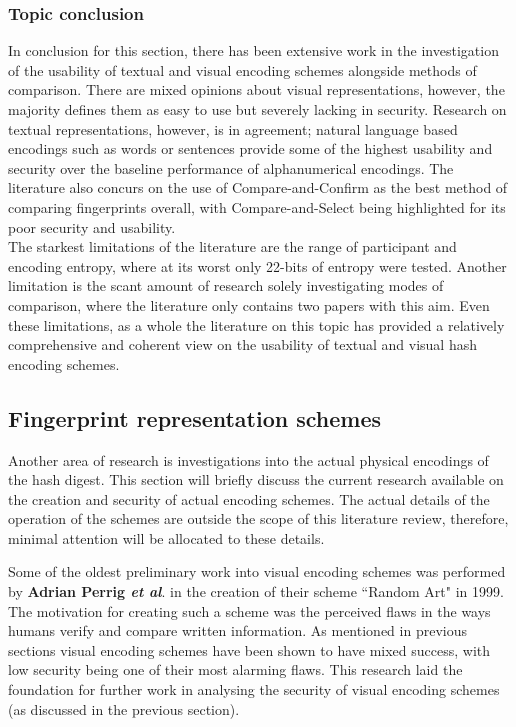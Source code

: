 \subsubsection{Topic conclusion}

In conclusion for this section, there has been extensive work in the investigation of the usability of textual and visual encoding schemes alongside methods of comparison. There are mixed opinions about visual representations, however, the majority defines them as easy to use but severely lacking in security. Research on textual representations, however, is in agreement; natural language based encodings such as words or sentences provide some of the highest usability and security over the baseline performance of alphanumerical encodings. The literature also concurs on the use of Compare-and-Confirm as the best method of comparing fingerprints overall, with Compare-and-Select being highlighted for its poor security and usability.\\
The starkest limitations of the literature are the range of participant and encoding entropy, where at its worst only 22-bits of entropy were tested. Another limitation is the scant amount of research solely investigating modes of comparison, where the literature only contains two papers with this aim. Even these limitations, as a whole the literature on this topic has provided a relatively comprehensive and coherent view on the usability of textual and visual hash encoding schemes.

\subsection{Fingerprint representation schemes}
Another area of research is investigations into the actual physical encodings of the hash digest. This section will briefly discuss the current research available on the creation and security of actual encoding schemes. The actual details of the operation of the schemes are outside the scope of this literature review, therefore, minimal attention will be allocated to these details.

Some of the oldest preliminary work into visual encoding schemes was performed by \textbf{Adrian Perrig \textit{et al}}\cite{perrig1999hash}. in the creation of their scheme ``Random Art" in 1999. The motivation for creating such a scheme was the perceived flaws in the ways humans verify and compare written information. As mentioned in previous sections visual encoding schemes have been shown to have mixed success, with low security being one of their most alarming flaws. This research laid the foundation for further work in analysing the security of visual encoding schemes (as discussed in the previous section).

